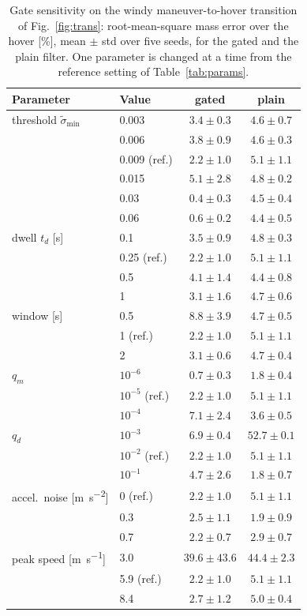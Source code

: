 \documentclass{ieeeaccess}
\begin{document}
\begin{table}[t]
\centering
\caption{Gate sensitivity on the windy maneuver-to-hover transition of
Fig.~\ref{fig:trans}: root-mean-square mass error over the hover [\si{\percent}],
mean $\pm$ std over five seeds, for the gated and the plain filter. One parameter
is changed at a time from the reference setting of Table~\ref{tab:params}.}
\label{tab:sens}
\setlength{\tabcolsep}{4pt}
\begin{tabular}{llcc}
\toprule
Parameter & Value & gated & plain \\
\midrule
threshold $\tilde\sigma_{\min}$ & 0.003 & $3.4\pm0.3$ & $4.6\pm0.7$ \\
 & 0.006 & $3.8\pm0.9$ & $4.6\pm0.3$ \\
 & 0.009 (ref.) & $2.2\pm1.0$ & $5.1\pm1.1$ \\
 & 0.015 & $5.1\pm2.8$ & $4.8\pm0.2$ \\
 & 0.03 & $0.4\pm0.3$ & $4.5\pm0.4$ \\
 & 0.06 & $0.6\pm0.2$ & $4.4\pm0.5$ \\
\midrule
dwell $t_d$ [\si{\second}] & 0.1 & $3.5\pm0.9$ & $4.8\pm0.3$ \\
 & 0.25 (ref.) & $2.2\pm1.0$ & $5.1\pm1.1$ \\
 & 0.5 & $4.1\pm1.4$ & $4.4\pm0.8$ \\
 & 1 & $3.1\pm1.6$ & $4.7\pm0.6$ \\
\midrule
window [\si{\second}] & 0.5 & $8.8\pm3.9$ & $4.7\pm0.5$ \\
 & 1 (ref.) & $2.2\pm1.0$ & $5.1\pm1.1$ \\
 & 2 & $3.1\pm0.6$ & $4.7\pm0.4$ \\
\midrule
$q_m$ & $10^{-6}$ & $0.7\pm0.3$ & $1.8\pm0.4$ \\
 & $10^{-5}$ (ref.) & $2.2\pm1.0$ & $5.1\pm1.1$ \\
 & $10^{-4}$ & $7.1\pm2.4$ & $3.6\pm0.5$ \\
\midrule
$q_d$ & $10^{-3}$ & $6.9\pm0.4$ & $52.7\pm0.1$ \\
 & $10^{-2}$ (ref.) & $2.2\pm1.0$ & $5.1\pm1.1$ \\
 & $10^{-1}$ & $4.7\pm2.6$ & $1.8\pm0.7$ \\
\midrule
accel.\ noise [\si{\meter\per\square\second}] & 0 (ref.) & $2.2\pm1.0$ & $5.1\pm1.1$ \\
 & 0.3 & $2.5\pm1.1$ & $1.9\pm0.9$ \\
 & 0.7 & $2.2\pm0.7$ & $2.9\pm0.7$ \\
\midrule
peak speed [\si{\meter\per\second}] & 3.0 & $39.6\pm43.6$ & $44.4\pm2.3$ \\
 & 5.9 (ref.) & $2.2\pm1.0$ & $5.1\pm1.1$ \\
 & 8.4 & $2.7\pm1.2$ & $5.0\pm0.4$ \\
\bottomrule
\end{tabular}
\end{table}
\end{document}
